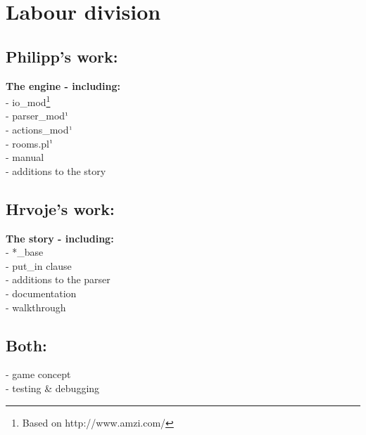\documentclass{article}
\begin{document}
\newcommand{\up}[1]{\ensuremath{^{\textrm{\tiny#1}}}}


\section*{Labour division}
	\subsection*{Philipp's work:}
	\textbf{The engine - including:} \\
		- io\_mod\footnote[1]{Based on http://www.amzi.com/} \\
		- parser\_mod\up{1} \\
		- actions\_mod\up{1} \\
		- rooms.pl\up{1} \\
		- manual \\
		- additions to the story
		
	
	\subsection*{Hrvoje's work:}
	\textbf{The story - including:} \\
		- *\_base \\
		- put\_in clause \\
		- additions to the parser \\
		- documentation \\
		- walkthrough
		
	\subsection*{Both:}
	- game concept \\
	- testing \& debugging
	
\end{document}

